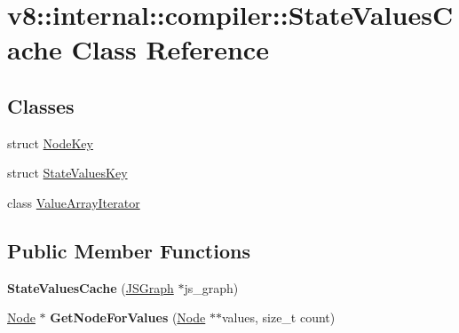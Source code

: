\hypertarget{classv8_1_1internal_1_1compiler_1_1_state_values_cache}{}\section{v8\+:\+:internal\+:\+:compiler\+:\+:State\+Values\+Cache Class Reference}
\label{classv8_1_1internal_1_1compiler_1_1_state_values_cache}
\subsection*{Classes}
\begin{DoxyCompactItemize}
\item 
struct \hyperlink{structv8_1_1internal_1_1compiler_1_1_state_values_cache_1_1_node_key}{Node\+Key}
\item 
struct \hyperlink{structv8_1_1internal_1_1compiler_1_1_state_values_cache_1_1_state_values_key}{State\+Values\+Key}
\item 
class \hyperlink{classv8_1_1internal_1_1compiler_1_1_state_values_cache_1_1_value_array_iterator}{Value\+Array\+Iterator}
\end{DoxyCompactItemize}
\subsection*{Public Member Functions}
\begin{DoxyCompactItemize}
\item 
{\bfseries State\+Values\+Cache} (\hyperlink{classv8_1_1internal_1_1compiler_1_1_j_s_graph}{J\+S\+Graph} $\ast$js\+\_\+graph)\hypertarget{classv8_1_1internal_1_1compiler_1_1_state_values_cache_aeb424ea48a844ff289355359c435883e}{}\label{classv8_1_1internal_1_1compiler_1_1_state_values_cache_aeb424ea48a844ff289355359c435883e}

\item 
\hyperlink{classv8_1_1internal_1_1compiler_1_1_node}{Node} $\ast$ {\bfseries Get\+Node\+For\+Values} (\hyperlink{classv8_1_1internal_1_1compiler_1_1_node}{Node} $\ast$$\ast$values, size\+\_\+t count)\hypertarget{classv8_1_1internal_1_1compiler_1_1_state_values_cache_ad2b11e054731dd69f78a4116713f53b7}{}\label{classv8_1_1internal_1_1compiler_1_1_state_values_cache_ad2b11e054731dd69f78a4116713f53b7}

\end{DoxyCompactItemize}
